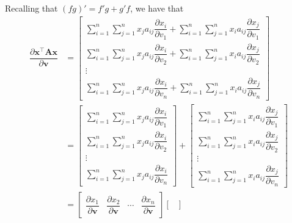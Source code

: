 \documentclass{article}
\newcommand{\trans}{\top}
\begin{document}
Recalling that \((fg)' = f'g + g'f\), we have that
\begin{align}
    \dfrac{\partial \mathbf{x}^\trans \mathbf{A} \mathbf{x}}{\partial \mathbf{v}} &= \begin{bmatrix}
        \displaystyle \sum_{i = 1}^{n}\sum_{j = 1}^{n} x_{j}a_{ij} \dfrac{\partial x_{i}}{\partial v_1} +
        \sum_{i = 1}^{n}\sum_{j = 1}^{n} x_{i}a_{ij} \dfrac{\partial x_{j}}{\partial v_1} \\ 
        \displaystyle \sum_{i = 1}^{n}\sum_{j = 1}^{n} x_{j}a_{ij} \dfrac{\partial x_{i}}{\partial v_2} +
        \sum_{i = 1}^{n}\sum_{j = 1}^{n} x_{i}a_{ij} \dfrac{\partial x_{j}}{\partial v_2} \\ 
        \vdots \\ 
        \displaystyle \sum_{i = 1}^{n}\sum_{j = 1}^{n} x_{j}a_{ij} \dfrac{\partial x_{i}}{\partial v_n} +
        \sum_{i = 1}^{n}\sum_{j = 1}^{n} x_{i}a_{ij} \dfrac{\partial x_{j}}{\partial v_n} 
    \end{bmatrix} \\
    &= \begin{bmatrix}
        \displaystyle \sum_{i = 1}^{n}\sum_{j = 1}^{n} x_{j}a_{ij} \dfrac{\partial x_{i}}{\partial v_1} \\
        \displaystyle \sum_{i = 1}^{n}\sum_{j = 1}^{n} x_{j}a_{ij} \dfrac{\partial x_{i}}{\partial v_2} \\
        \vdots \\ 
        \displaystyle \sum_{i = 1}^{n}\sum_{j = 1}^{n} x_{j}a_{ij} \dfrac{\partial x_{i}}{\partial v_n}
    \end{bmatrix} +
    \begin{bmatrix}
        \displaystyle \sum_{i = 1}^{n}\sum_{j = 1}^{n} x_{i}a_{ij} \dfrac{\partial x_{j}}{\partial v_1} \\ 
        \displaystyle \sum_{i = 1}^{n}\sum_{j = 1}^{n} x_{i}a_{ij} \dfrac{\partial x_{j}}{\partial v_2} \\ 
        \vdots \\ 
        \displaystyle \sum_{i = 1}^{n}\sum_{j = 1}^{n} x_{i}a_{ij} \dfrac{\partial x_{j}}{\partial v_n} 
    \end{bmatrix} \\
    &= \begin{bmatrix}
       \dfrac{\partial x_{1}}{\partial \mathbf{v}} & \dfrac{\partial x_{2}}{\partial \mathbf{v}} & \cdots  & \dfrac{\partial x_{n}}{\partial \mathbf{v}}
    \end{bmatrix}
    \begin{bmatrix}

\end{bmatrix}
\end{align}
\end{document}
